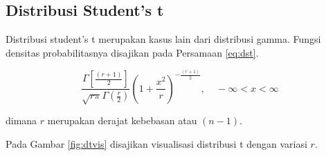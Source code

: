 \documentclass[]{book}
\begin{document}
\subsection{Distribusi Student's t}\label{distribusi-students-t}

Distribusi student's t merupakan kasus lain dari distribusi gamma.
Fungsi densitas probabilitasnya disajikan pada Persamaan \eqref{eq:dst}.

\begin{equation}
   \frac{\Gamma\left[\frac{\left(r+1\right)}{2}\right]}{\sqrt{r\pi}\Gamma\left(\frac{r}{2}\right)}\left(1+\frac{x^2}{r}\right)^{-\frac{\left(r+1\right)}{2}},\ \ \ \ \ -\infty<x<\infty
  \label{eq:dst}
\end{equation}

dimana \(r\) merupakan derajat kebebasan atau \(\left(n-1\right)\).

Pada Gambar \ref{fig:dtvis} disajikan visualisasi distribusi t dengan
variasi \(r\).
\end{document}
